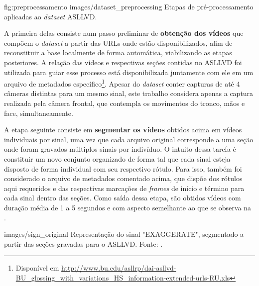 \image
    {fig:preprocessamento}
    {images/dataset_preprocessing}
    {Etapas de pré-processamento aplicadas ao \textit{dataset} ASLLVD.}

A primeira delas consiste num passo preliminar de \textbf{obtenção dos vídeos} que compõem o \textit{dataset} a partir das URLs onde estão disponibilizados, afim de reconstituir a base localmente de forma automática, viabilizando as etapas posteriores. A relação das vídeos e respectivas seções contidas no ASLLVD foi utilizada para guiar esse processo está disponibilizada juntamente com ele em um arquivo de metadados específico\footnote{
    Disponível em \url{http://www.bu.edu/asllrp/dai-asllvd-BU_glossing_with_variations_HS_information-extended-urls-RU.xls}
}. Apesar do \textit{dataset} conter capturas de até 4 câmeras distintas para um mesmo sinal, este trabalho considera apenas a captura realizada pela câmera frontal, que contempla os movimentos do tronco, mãos e face, simultaneamente.

A etapa seguinte consiste em \textbf{segmentar os vídeos} obtidos acima em vídeos individuais por sinal, uma vez que cada arquivo original corresponde a uma seção onde foram gravados múltiplos sinais por indivíduo. O intuito dessa tarefa é constituir um novo conjunto organizado de forma tal que cada sinal esteja disposto de forma individual com seu respectivo rótulo. Para isso, também foi considerado o arquivo de metadados comentado acima, que dispõe dos rótulos aqui requeridos e das respectivas marcações de \textit{frames} de início e término para cada sinal dentro das seções. Como saída dessa etapa, são obtidos vídeos com duração média de 1 a 5 segundos e com aspecto semelhante ao que se observa na .

    {images/sign_original}
    {Representação do sinal "EXAGGERATE", segmentado a partir das seções gravadas para o ASLLVD. Fonte: \cite{athitsos-asllvd-2008}.}

